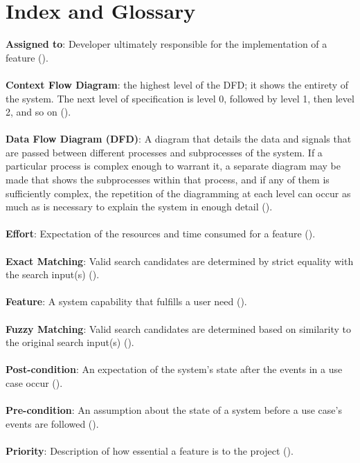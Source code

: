 \documentclass{article}
\begin{document}
\section{Index and Glossary}
\textbf{Assigned to}: Developer ultimately responsible for the implementation of a feature (\pageref{assigned_to}).\\ \\
\textbf{Context Flow Diagram}: the highest level of the DFD; it shows the entirety of the system. The next level of specification is level 0, followed by level 1, then level 2, and so on (\pageref{cfd}).\\ \\
\textbf{Data Flow Diagram (DFD)}: A diagram that details the data and signals that are passed between different processes and subprocesses of the system. If a particular process is complex enough to warrant it, a separate diagram may be made that shows the subprocesses within that process, and if any of them is sufficiently complex, the repetition of the diagramming at each level can occur as much as is necessary to explain the system in enough detail (\pageref{dfd}).\\ \\
\textbf{Effort}: Expectation of the resources and time consumed for a feature (\pageref{effort}).\\ \\
\textbf{Exact Matching}: Valid search candidates are determined by strict equality with the search input(s) (\pageref{feature}).\\ \\
\textbf{Feature}: A system capability that fulfills a user need (\pageref{feature}).\\ \\
\textbf{Fuzzy Matching}: Valid search candidates are determined based on similarity to the original search input(s) (\pageref{feature}).\\ \\
\textbf{Post-condition}: An expectation of the system's state after the events in a use case occur (\pageref{post_cond}).\\ \\
\textbf{Pre-condition}: An assumption about the state of a system before a use case's events are followed (\pageref{pre_cond}).\\ \\
\textbf{Priority}: Description of how essential a feature is to the project (\pageref{priority}).\\ \\
\end{document}
